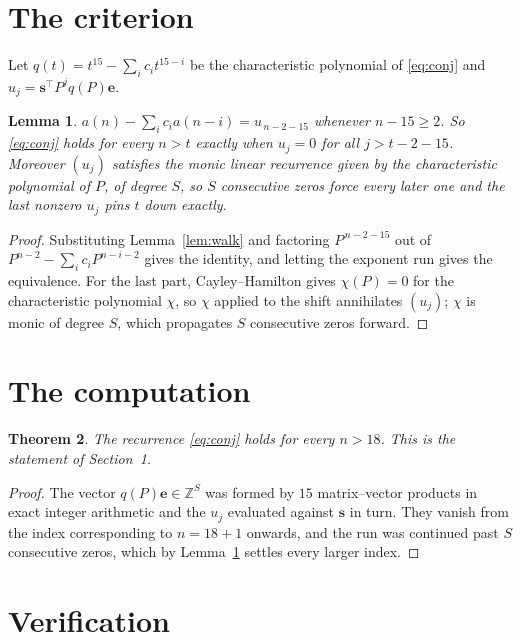 \documentclass[11pt,a4paper]{article}
\theoremstyle{plain}
\newtheorem{theorem}{Theorem}
\newtheorem{lemma}[theorem]{Lemma}
\theoremstyle{definition}
\begin{document}
\section{The criterion}

Let $q(t)=t^{15}-\sum_i c_i t^{15-i}$ be the characteristic polynomial of
\eqref{eq:conj} and $u_j=\mathbf{s}^{\!\top}P^{j}q(P)\mathbf{e}$.

\begin{lemma}\label{lem:crit}
$a(n)-\sum_i c_i a(n-i)=u_{\,n-2-15}$ whenever $n-15\ge2$. So \eqref{eq:conj}
holds for every $n>t$ exactly when $u_j=0$ for all $j>t-2-15$. Moreover $(u_j)$
satisfies the monic linear recurrence given by the characteristic polynomial of $P$, of
degree $S$, so $S$ consecutive zeros force every later one and the last nonzero $u_j$ pins
$t$ down exactly.
\end{lemma}

\begin{proof}
Substituting Lemma~\ref{lem:walk} and factoring $P^{\,n-2-15}$ out of
$P^{n-2}-\sum_i c_i P^{n-i-2}$ gives the identity, and letting the exponent run gives the
equivalence. For the last part, Cayley--Hamilton gives $\chi(P)=0$ for the characteristic
polynomial $\chi$, so $\chi$ applied to the shift annihilates $(u_j)$; $\chi$ is monic of
degree $S$, which propagates $S$ consecutive zeros forward.
\end{proof}

\section{The computation}

\begin{theorem}
The recurrence \eqref{eq:conj} holds for every $n>18$. This is the statement of
Section~1.
\end{theorem}

\begin{proof}
The vector $q(P)\mathbf{e}\in\mathbb{Z}^{S}$ was formed by $15$ matrix--vector
products in exact integer arithmetic and the $u_j$ evaluated against $\mathbf{s}$ in turn.
They vanish from the index corresponding to $n=18+1$ onwards, and the run was continued
past $S$ consecutive zeros, which by Lemma~\ref{lem:crit} settles every larger index.
\end{proof}

\section{Verification}
\end{document}
